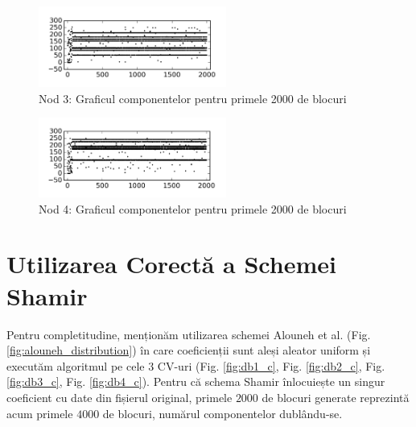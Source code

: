 \documentclass[oneside, 12pt]{book}
\begin{document}
\begin{figure}[h!]
\begin{center}
\includegraphics[width=0.55\textwidth]{img/carouri_db3.png}    %
\caption{Nod 3: Graficul componentelor pentru primele 2000 de blocuri} 
\label{fig:carouri_db3}
\end{center}
\end{figure}



\begin{figure}[b]
\begin{center}
\includegraphics[width=0.55\textwidth]{img/carouri_db4.png}    %
\caption{Nod 4: Graficul componentelor pentru primele 2000 de blocuri} 
\label{fig:carouri_db4}
\end{center}
\end{figure}

\clearpage

\section{Utilizarea Corectă a Schemei Shamir}

Pentru completitudine, menționăm utilizarea schemei Alouneh et al. (Fig. \ref{fig:alouneh_distribution}) în care coeficienții sunt aleși aleator uniform și executăm algoritmul pe cele $3$ CV-uri (Fig. \ref{fig:db1_c}, Fig. \ref{fig:db2_c}, Fig. \ref{fig:db3_c}, Fig. \ref{fig:db4_c}). Pentru că schema Shamir înlocuiește un singur coeficient cu date din fișierul original, primele $2000$ de blocuri generate reprezintă acum primele $4000$ de blocuri, numărul componentelor dublându-se.
\end{document}
